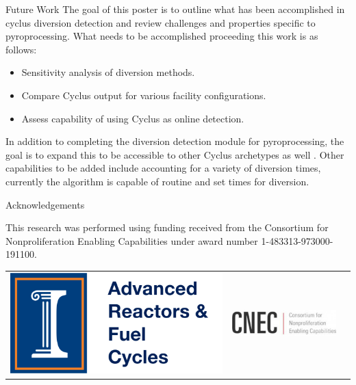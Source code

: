 \documentclass[final]{beamer}
\newlength{\onecolwid}
\newlength{\threecolwid}
\begin{document}
\begin{frame}[t]
\begin{columns}[t,totalwidth=\threecolwid]
\begin{column}{\onecolwid}
\begin{alertblock}{Future Work}
	The goal of this poster is to outline what has been accomplished in cyclus diversion detection and review challenges and properties
	specific to pyroprocessing. What needs to be accomplished proceeding this work is as follows:
	\begin{itemize}
		\item Sensitivity analysis of diversion methods.
		\item Compare Cyclus output for various facility configurations.
		\item Assess capability of using Cyclus as online detection.
	\end{itemize} 
	\vspace{10mm}
	In addition to completing the diversion detection module for pyroprocessing, the goal is to expand this to be accessible to
	other Cyclus archetypes as well \cite{Huff_2016}. Other capabilities to be added include accounting for a variety of diversion times,
	currently the algorithm is capable of routine and set times for diversion.
\end{alertblock}



\begin{block}{Acknowledgements}
	
	This research was performed using funding received
	from the Consortium for Nonproliferation Enabling
	Capabilities under award number 1-483313-973000-191100.
	
	\vspace{10mm}
	\begin{center}
		\begin{tabular}{ccc}
			\includegraphics[width=0.3\linewidth]{logo.png} & \includegraphics[width=0.3\linewidth]{cnec_oldlogo.png}
		\end{tabular}
	\end{center}
	

\end{block}
\end{column}
\end{columns}
\end{frame}
\end{document}
